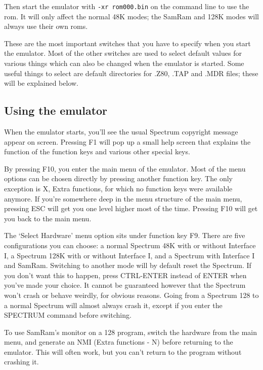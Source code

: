     Then start the emulator with \verb|-xr rom000.bin| on the command line to use
    the rom.  It will only affect the normal 48K modes; the SamRam and 128K
    modes will always use their own roms.

    These are the most important switches that you have to specify when you
    start the emulator.  Most of the other switches are used to select
    default values for various things which can also be changed when the
    emulator is started.  Some useful things to select are default
    directories for .Z80, .TAP and .MDR files; these will be explained
    below.



\subsection{Using the emulator}

    When the emulator starts, you'll see the usual Spectrum copyright
    message appear on screen.  Pressing F1 will pop up a small help screen
    that explains the function of the function keys and various other
    special keys.

    By pressing F10, you enter the main menu of the emulator.  Most of the
    menu options can be chosen directly by pressing another function key.
    The only exception is X, Extra functions, for which no function keys
    were available anymore.  If you're somewhere deep in the menu structure
    of the main menu, pressing ESC will get you one level higher most of the
    time.  Pressing F10 will get you back to the main menu.

    The `Select Hardware' menu option sits under function key F9.  There are
    five configurations you can choose: a normal Spectrum 48K with or
    without Interface I, a Spectrum 128K with or without Interface I, and a
    Spectrum with Interface I and SamRam.  Switching to another mode will by
    default reset the Spectrum.  If you don't want this to happen, press
    CTRL-ENTER instead of ENTER when you've made your choice.  It cannot be
    guaranteed however that the Spectrum won't crash or behave weirdly, for
    obvious reasons.  Going from a Spectrum 128 to a normal Spectrum will
    almost always crash it, except if you enter the SPECTRUM command before
    switching.

    To use SamRam's monitor on a 128 program, switch the hardware from the
    main menu, and generate an NMI (Extra functions - N) before returning to
    the emulator.  This will often work, but you can't return to the program
    without crashing it.

